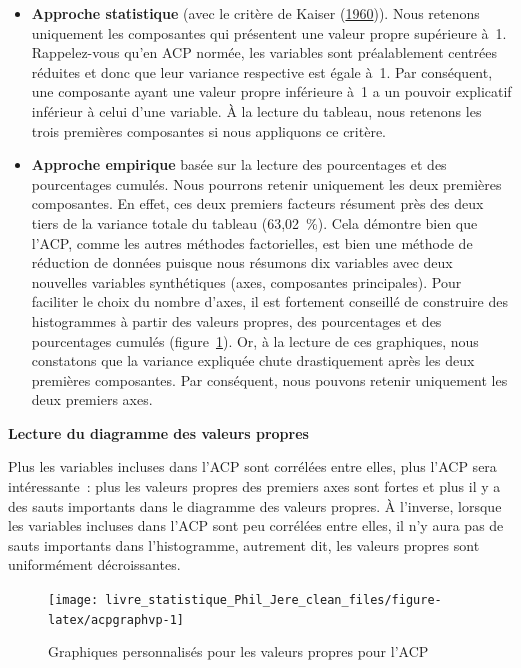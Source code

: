 \documentclass[
  11pt,
  french,
]{book}
\makeatletter
\providecommand{\tightlist}{%
  \setlength{\itemsep}{0pt}\setlength{\parskip}{0pt}}
\newenvironment{kframev}{%
\medskip{}
\setlength{\fboxsep}{.8em}
 \def\at@end@of@kframev{}%
 \ifinner\ifhmode%
  \def\at@end@of@kframev{\end{minipage}}%
  \begin{minipage}{\columnwidth}%
 \fi\fi%
 \def\FrameCommand##1{\hskip\@totalleftmargin \hskip-\fboxsep
 \colorbox{shadebluecolor}{##1}\hskip-\fboxsep
     \hskip-\linewidth \hskip-\@totalleftmargin \hskip\columnwidth}%
 \MakeFramed {\advance\hsize-\width
   \@totalleftmargin\z@ \linewidth\hsize
   \@setminipage}}%
 {\par\unskip\endMakeFramed%
 \at@end@of@kframev}
\newenvironment{rmdblock}[1]
  {
  \begin{itemize}
  \renewcommand{\labelitemi}{
    \raisebox{-.7\height}[0pt][0pt]{
      {\setkeys{Gin}{width=3em,keepaspectratio}\texttt{[image: images/\#1]}}
    }
  }
  \setlength{\fboxsep}{1em}
  \begin{kframev}
  \small
  \item
  }
  {
  \end{kframev}
  \end{itemize}
  }
\newenvironment{bloc_astuce}
  {\begin{rmdblock}{astuce}}
  {\end{rmdblock}}
\makeatother
\begin{document}
\begin{itemize}
\tightlist
\item
  \textbf{Approche statistique} (avec le critère de Kaiser (\protect\hyperlink{ref-kaiser1960application}{1960})). Nous retenons uniquement les composantes qui présentent une valeur propre supérieure à~1. Rappelez-vous qu'en ACP normée, les variables sont préalablement centrées réduites et donc que leur variance respective est égale à~1. Par conséquent, une composante ayant une valeur propre inférieure à~1 a un pouvoir explicatif inférieur à celui d'une variable. À la lecture du tableau, nous retenons les trois premières composantes si nous appliquons ce critère.
\item
  \textbf{Approche empirique} basée sur la lecture des pourcentages et des pourcentages cumulés. Nous pourrons retenir uniquement les deux premières composantes. En effet, ces deux premiers facteurs résument près des deux tiers de la variance totale du tableau (63,02~\%). Cela démontre bien que l'ACP, comme les autres méthodes factorielles, est bien une méthode de réduction de données puisque nous résumons dix variables avec deux nouvelles variables synthétiques (axes, composantes principales). Pour faciliter le choix du nombre d'axes, il est fortement conseillé de construire des histogrammes à partir des valeurs propres, des pourcentages et des pourcentages cumulés (figure~\ref{fig:acpgraphvp}). Or, à la lecture de ces graphiques, nous constatons que la variance expliquée chute drastiquement après les deux premières composantes. Par conséquent, nous pouvons retenir uniquement les deux premiers axes.
\end{itemize}

\begin{bloc_astuce}
\textbf{Lecture du diagramme des valeurs propres}

Plus les variables incluses dans l'ACP sont corrélées entre elles, plus l'ACP sera intéressante~: plus les valeurs propres des premiers axes sont fortes et plus il y a des sauts importants dans le diagramme des valeurs propres. À l'inverse, lorsque les variables incluses dans l'ACP sont peu corrélées entre elles, il n'y aura pas de sauts importants dans l'histogramme, autrement dit, les valeurs propres sont uniformément décroissantes.

\end{bloc_astuce}

\begin{figure}

{\centering \texttt{[image: livre\_statistique\_Phil\_Jere\_clean\_files/figure-latex/acpgraphvp-1]} 

}

\caption{Graphiques personnalisés pour les valeurs propres pour l'ACP}\label{fig:acpgraphvp}
\end{figure}
\end{document}

